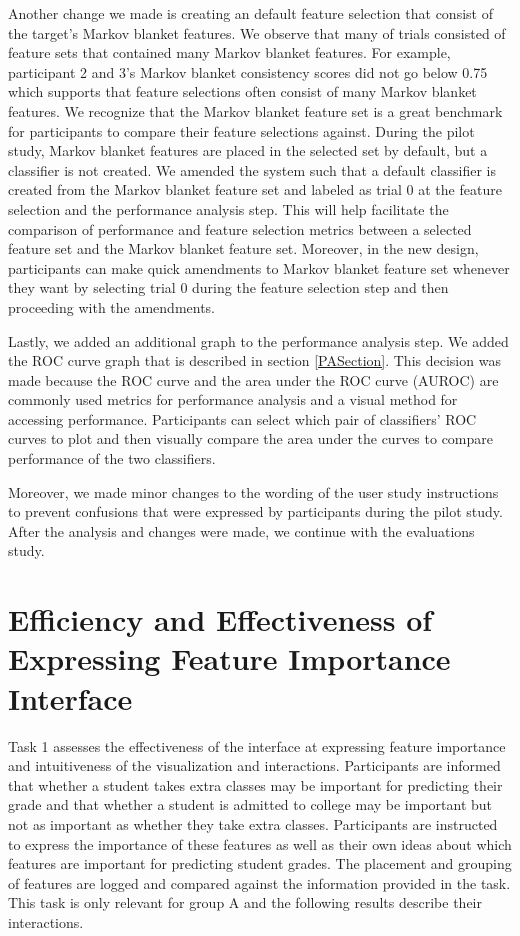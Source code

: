 Another change we made is creating an default feature selection that consist of the target's Markov blanket features. We observe that many of trials consisted of feature sets that contained many Markov blanket features. For example, participant 2 and 3's Markov blanket consistency scores did not go below 0.75 which supports that feature selections often consist of many Markov blanket features. We recognize that the Markov blanket feature set is a great benchmark for participants to compare their feature selections against. During the pilot study, Markov blanket features are placed in the selected set by default, but a classifier is not created. We amended the system such that a default classifier is created from the Markov blanket feature set and labeled as trial 0 at the feature selection and the performance analysis step. This will help facilitate the comparison of performance and feature selection metrics between a selected feature set and the Markov blanket feature set. Moreover, in the new design, participants can make quick amendments to Markov blanket feature set whenever they want by selecting trial 0 during the feature selection step and then proceeding with the amendments.

Lastly, we added an additional graph to the performance analysis step. We added the ROC curve graph that is described in section \ref{PASection}. This decision was made because the ROC curve and the area under the ROC curve (AUROC) are commonly used metrics for performance analysis and a visual method for accessing performance. Participants can select which pair of classifiers' ROC curves to plot and then visually compare the area under the curves to compare performance of the two classifiers.

Moreover, we made minor changes to the wording of the user study instructions to prevent confusions that were expressed by participants during the pilot study. After the analysis and changes were made, we continue with the evaluations study.

\section{Efficiency and Effectiveness of Expressing Feature Importance Interface}
Task 1 assesses the effectiveness of the interface at expressing feature importance and intuitiveness of the visualization and interactions. Participants are informed that whether a student takes extra classes may be important for predicting their grade and that whether a student is admitted to college may be important but not as important as whether they take extra classes. Participants are instructed to express the importance of these features as well as their own ideas about which features are important for predicting student grades. The placement and grouping of features are logged and compared against the information provided in the task. This task is only relevant for group A and the following results describe their interactions.


